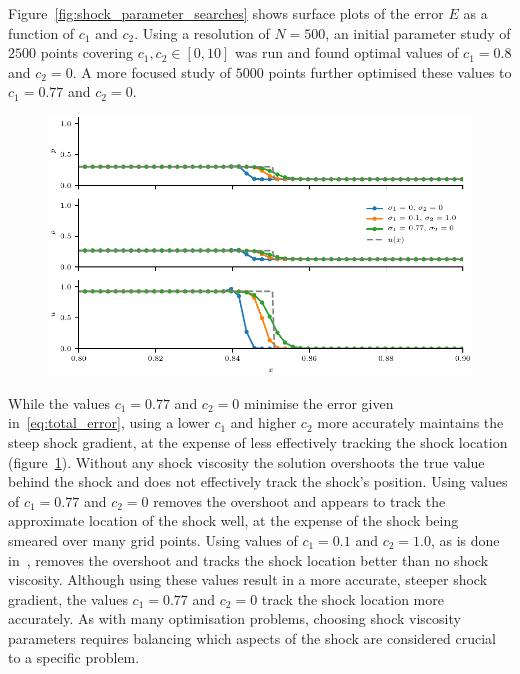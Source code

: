 Figure~\ref{fig:shock_parameter_searches} shows surface plots of the error $E$ as a function of $c_1$ and $c_2$. Using a resolution of $N=500$, an initial parameter study of $2500$ points covering $c_1, c_2 \in [0, 10]$ was run and found optimal values of $c_1 = 0.8$ and $c_2 = 0$. A more focused study of $5000$ points further optimised these values to $c_1 = 0.77$ and $c_2 = 0$.

\begin{figure}[t]
  \centering
  \includegraphics[width=\linewidth]{shock_viscosity_variables.pdf}
  \label{fig:shock_viscosity_variables}
\end{figure}

While the values $c_1 = 0.77$ and $c_2 = 0$ minimise the error given in~\eqref{eq:total_error}, using a lower $c_1$ and higher $c_2$ more accurately maintains the steep shock gradient, at the expense of less effectively tracking the shock location (figure~\ref{fig:shock_viscosity_variables}). Without any shock viscosity the solution overshoots the true value behind the shock and does not effectively track the shock's position. Using values of $c_1 = 0.77$ and $c_2 = 0$ removes the overshoot and appears to track the approximate location of the shock well, at the expense of the shock being smeared over many grid points. Using values of $c_1 = 0.1$ and $c_2 = 1.0$, as is done in~\cite{arberStaggeredGridLagrangian2001}, removes the overshoot and tracks the shock location better than no shock viscosity. Although using these values result in a more accurate, steeper shock gradient, the values $c_1 = 0.77$ and $c_2 = 0$ track the shock location more accurately. As with many optimisation problems, choosing shock viscosity parameters requires balancing which aspects of the shock are considered crucial to a specific problem. 


